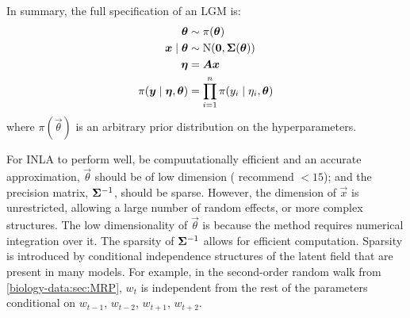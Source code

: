 \documentclass[thesis.tex]{subfiles}
\begin{document}
In summary, the full specification of an LGM is:
\begin{align}
    \bm{\theta} &\sim \pi(\bm{\theta}) \\
    \bm{x} \mid \bm{\theta} &\sim \operatorname{N}(\bm{0}, \bm{\Sigma}(\bm{\theta})) \\
    \bm{\eta} &= \bm{A} \bm{x} \\
    \pi(\bm{y} \mid \bm{\eta}, \bm{\theta}) &= \prod_{i=1}^n \pi(y_i \mid \eta_i, \bm{\theta})
\end{align}
where $\pi(\vec{\theta})$ is an arbitrary prior distribution on the hyperparameters.


For INLA to perform well, \ie be compuutationally efficient and an accurate approximation, $\vec{\theta}$ should be of low dimension (\textcite{martinoINLAtutorial} recommend $< 15$); and the precision matrix, $\bm{\Sigma}^{-1}$, should be sparse.
However, the dimension of $\vec{x}$ is unrestricted, allowing a large number of random effects, or more complex structures.
The low dimensionality of $\vec{\theta}$ is because the method requires numerical integration over it.
The sparsity of $\bm{\Sigma}^{-1}$ allows for efficient computation.
Sparsity is introduced by conditional independence structures of the latent field that are present in many models.
For example, in the second-order random walk from \cref{biology-data:sec:MRP}, $w_t$ is independent from the rest of the parameters conditional on $w_{t-1}$, $w_{t-2}$, $w_{t+1}$, $w_{t+2}$.

\end{document}
